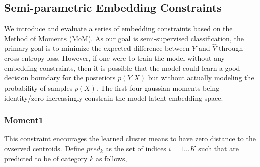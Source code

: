 \documentclass[10pt,twocolumn,letterpaper]{article}
\begin{document}

\subsection{Semi-parametric Embedding Constraints}

We introduce and evaluate a series of embedding constraints based on the Method of Moments (MoM). 
As our goal is semi-supervised classification, the primary goal is to minimize the expected difference between $Y$ and $\hat{Y}$ through cross entropy loss. 
However, if one were to train the model without any embedding constraints, then it is possible that the model could learn a good decision boundary for the posteriors $p(Y|X)$ but without actually modeling the probability of samples $p(X)$.
The first four gaussian moments being identity/zero increasingly constrain the model latent embedding space. 

%

\subsubsection{Moment1}

This constraint encourages the learned cluster means to have zero distance to the ovserved centroids. 
Define $pred_k$ as the set of indices $i=1 \dots K$ such that are predicted to be of category $k$ as follows,
\end{document}
